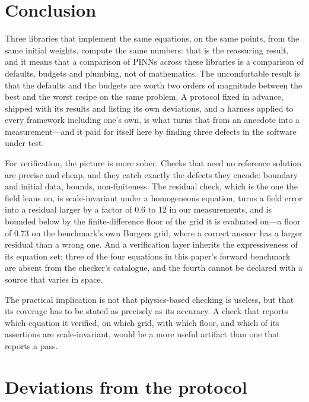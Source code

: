 \documentclass[11pt]{article}
\newcommand{\fit}[1]{\resizebox{\ifdim\width>\linewidth\linewidth\else\width\fi}{!}{#1}}
\begin{document}
\section{Conclusion}

Three libraries that implement the same equations, on the same points, from the same initial
weights, compute the same numbers: that is the reassuring result, and it means that a comparison of
PINNs across these libraries is a comparison of defaults, budgets and plumbing, not of mathematics.
The uncomfortable result is that the defaults and the budgets are worth two orders of magnitude
between the best and the worst recipe on the same problem. A protocol fixed in advance, shipped with
its results and listing its own deviations, and a harness applied to every framework including one's
own, is what turns that from an anecdote into a measurement---and it paid for itself here by finding
three defects in the software under test.

For verification, the picture is more sober. Checks that need no reference solution are precise and
cheap, and they catch exactly the defects they encode: boundary and initial data, bounds,
non-finiteness. The residual check, which is the one the field leans on, is scale-invariant under a
homogeneous equation, turns a field error into a residual larger by a factor of $0.6$ to $12$ in our
measurements, and is bounded below by the finite-difference floor of the grid it is evaluated
on---a floor of $0.73$ on the benchmark's own Burgers grid, where a correct answer has a larger
residual than a wrong one. And a verification layer inherits the expressiveness of its equation set:
three of the four equations in this paper's forward benchmark are absent from the checker's
catalogue, and the fourth cannot be declared with a source that varies in space.

The practical implication is not that physics-based checking is useless, but that its coverage has to
be stated as precisely as its accuracy. A check that reports which equation it verified, on which
grid, with which floor, and which of its assertions are scale-invariant, would be a more useful
artifact than one that reports a pass.

\appendix

\section{Deviations from the protocol}\label{app:deviations}

\begin{table}[h]
\centering\small
\fit{}
\caption{Runs actually present in the result files, per track and framework. A1 ran three seeds, not
the protocol's five (cut order, item 3); Allen--Cahn was cut from A1 in advance (item 1). Track~B used
12 epochs, chosen to keep the track inside the budget. Track~D was kept.}
\label{tab:deviations}
\end{table}
\end{document}
